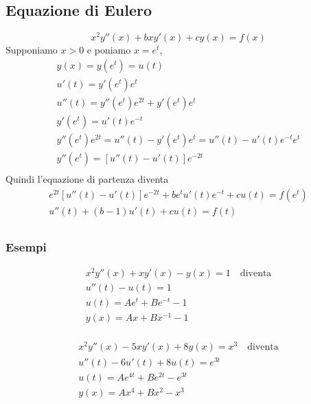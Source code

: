 \documentclass[10pt,a4paper,fleqn]{article}
\begin{document}
    \subsection*{Equazione di Eulero}

    \[
        x^2 y''(x)+ bxy'(x) + cy(x) = f(x)
    \]
    Supponiamo $x>0$ e poniamo $x=e^t$,
    \begin{multline*}
        y(x)=y(e^t)=u(t)\\
        u'(t)=y'(e^t)e^t\\
        u''(t)=y''(e^t)e^{2t}+y'(e^t)e^t\\
        y'(e^t)=u'(t)e^{-t}\\
        y''(e^t)e^{2t}=u''(t)-y'(e^t)e^t=u''(t)-u'(t)e^{-t}e^t\\
        y''(e^t)=\left[u''(t)-u'(t)\right]e^{-2t}\\
    \end{multline*}
    Quindi l'equazione di partenza diventa
    \begin{multline*}
        e^{2t}\left[u''(t)-u'(t)\right]e^{-2t}+be^tu'(t)e^{-t}+cu(t)=f(e^t)\\
        u''(t)+(b-1)u'(t)+cu(t)=f(t)\\
    \end{multline*}
    \subsubsection*{Esempi}
    \begin{minipage}{0.5\textwidth} 
        \begin{multline*}
            x^2 y''(x) + xy'(x)-y(x)=1 \quad\text{diventa}\\
            u''(t)-u(t)=1\\
            u(t)=Ae^t+Be^{-t}-1\\
            y(x)=Ax+Bx^{-1}-1\\
        \end{multline*}
    \end{minipage}
    \begin{minipage}{0.5\textwidth} 
        \begin{multline*}
            x^2 y''(x) -5xy'(x) + 8y(x)=x^3 \quad\text{diventa}\\
            u''(t)-6u'(t) + 8u(t)= e^{3t}\\
            u(t)=Ae^{4t}+Be^{2t}-e^{3t}\\
            y(x)=Ax^4+Bx^2-x^3\\
        \end{multline*}
    \end{minipage}
\end{document}
